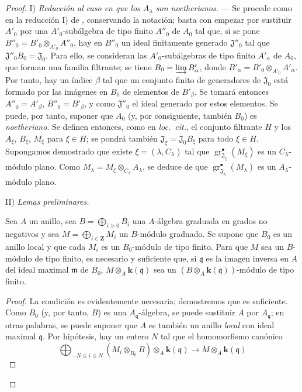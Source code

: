 \begin{proof}
\medskip
\noindent I) \emph{Reducción al caso en que los $A_\lambda$
son noetherianos.} --- Se procede como en la reducción I) de
, conservando la notación; basta con empezar por sustituir
$A'_0$ por una $A'_0$-subálgebra de tipo finito
$A''_0$ de $A_0$ tal que, si se pone
$B''_0=B'_0\otimes_{A'_0}A''_0$, hay
en $B''_0$ un ideal finitamente generado $\mathfrak J''_0$ tal que
$\mathfrak J''_0B_0=\mathfrak J_0$. Para ello, se consideran las
$A'_0$-subálgebras de tipo finito $A'_\alpha$ de
$A_0$, que forman una familia filtrante; se tiene
$B_0=\varinjlim B'_\alpha$, donde
$B'_\alpha=B'_0\otimes_{A'_0}A'_\alpha$.
Por tanto, hay un índice $\beta$ tal que un conjunto finito de generadores de
$\mathfrak J_0$ está formado por las imágenes en $B_0$ de elementos de
$B'_\beta$. Se tomará entonces $A''_0=A'_\beta$,
$B''_0=B'_\beta$, y como $\mathfrak J''_0$ el ideal
generado por estos elementos. Se puede, por tanto, suponer que $A_0$
(y, por consiguiente, también $B_0$) es \emph{noetheriano}. Se definen entonces, como en
\emph{loc.\ cit.}, el conjunto filtrante $H$ y los $A_\xi$,
$B_\xi$, $M_\xi$ para $\xi\in H$; se pondrá también
$\mathfrak J_\xi=\mathfrak J_0B_\xi$ para todo
$\xi\in H$. Supongamos demostrado que existe
$\xi=(\lambda,C_\lambda)$ tal que
$\operatorname{gr}_{\mathfrak J_\xi}^\bullet(M_\xi)$ es un
$C_\lambda$-módulo plano. Como
$M_\lambda=M_\xi\otimes_{C_\lambda}A_\lambda$, se deduce de  que
$\operatorname{gr}_{\mathfrak J_\lambda}^\bullet(M_\lambda)$ es un
$A_\lambda$-módulo plano.

\medskip
\noindent II) \emph{Lemas preliminares.}

\begin{lemma}[11.2.9.3]
\label{IV.11.2.9.3}
Sea $A$ un anillo, sea
$B=\bigoplus_{i\geq0}B_i$ una
$A$-álgebra graduada en grados no negativos y sea
$M=\bigoplus_{i\in\mathbf Z}M_i$ un
$B$-módulo graduado. Se supone que $B_0$ es un anillo local y
que cada $M_i$ es un $B_0$-módulo de tipo finito.
Para que $M$ sea un $B$-módulo de tipo finito, es necesario
y suficiente que, si $\mathfrak q$ es la imagen inversa en
$A$ del ideal maximal $\mathfrak m$ de $B_0$,
$M\otimes_A\boldsymbol{k}(\mathfrak q)$ sea un
$(B\otimes_A\boldsymbol{k}(\mathfrak q))$-módulo
de tipo finito.
\end{lemma}



\begin{proof}
La condición es evidentemente necesaria; demostremos que es
suficiente. Como $B_0$ (y, por tanto, $B$) es una
$A_{\mathfrak q}$-álgebra, se puede sustituir $A$ por
$A_{\mathfrak q}$; en otras palabras, se puede suponer que
$A$ es también un anillo \emph{local} con ideal maximal
$\mathfrak q$. Por hipótesis, hay un entero $N$ tal
que el homomorfismo canónico
\[
\bigoplus_{-N\leq i\leq N}(M_i\otimes_{B_0}B)
\otimes_A\boldsymbol{k}(\mathfrak q)\longrightarrow M\otimes_A\boldsymbol{k}(\mathfrak q)
\]




\end{proof}
\end{proof}
